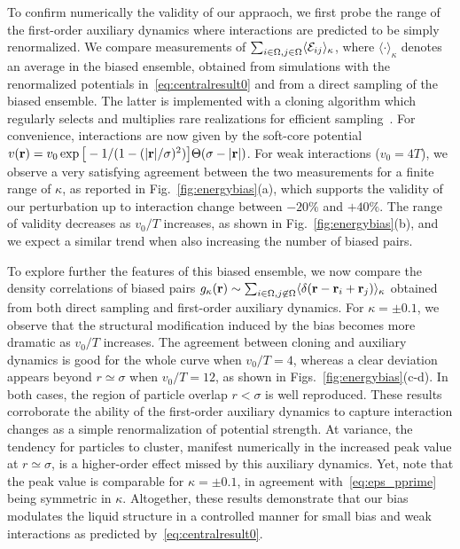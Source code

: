 \documentclass[superscriptaddress, twocolumn, prx, longbibliography, nofootinbib]{revtex4-1}
\begin{document}
To confirm numerically the validity of our appraoch, we first probe the range of the first-order auxiliary dynamics where interactions {are predicted to be} simply renormalized. We compare measurements of $\sum_{i\in\Omega, j\in\Omega}\langle{\cal E}_{ij}\rangle_\kappa$, where $\langle\cdot\rangle_\kappa$ denotes an average in the biased ensemble, obtained from simulations {with} {the renormalized potentials in}~\eqref{eq:centralresult0} and from a direct sampling of the biased ensemble. The latter is implemented with a cloning algorithm which regularly selects and multiplies rare realizations for efficient sampling~\cite{Giadina2006, tailleur2007probing, Hurtado2009, Nemoto2016, Ray2018, Klymko2018, Brewer2018}. For convenience, interactions are now given by the soft-core potential $v({\bf r}) = v_0\exp\big[-1 / (1 - (|{\bf r}|/\sigma)^2)\big]\Theta(\sigma-|{\bf r}|)$. For weak interactions ($v_0=4T$), we observe a very satisfying agreement between the two measurements for a finite range of $\kappa$, as reported in Fig.~\ref{fig:energybias}(a), which supports the validity of our perturbation up to interaction change between $-20\%$ and $+40\%$. The range of validity decreases as $v_0/T$ increases, as shown in Fig.~\ref{fig:energybias}(b), and we expect a similar trend when also increasing the number of biased pairs.


To explore further the features of this biased ensemble, we now compare the density correlations of biased pairs $g_\kappa({\bf r})\sim \sum_{i\in\Omega,j\not\in\Omega}\langle \delta({\bf r}-{\bf r}_i+{\bf r}_j)\rangle_\kappa$ obtained from both direct sampling and first-order auxiliary dynamics. For $\kappa=\pm0.1$, we observe that the structural modification induced by the bias becomes more dramatic as $v_0/T$ increases. The agreement between cloning and auxiliary dynamics is good for the whole curve when $v_0/T=4$, whereas a clear deviation appears beyond $r\simeq\sigma$ when $v_0/T=12$, as shown in Figs.~\ref{fig:energybias}(c-d). In both cases, the region of particle overlap $r<\sigma$ is well reproduced. {These results corroborate the ability of the first-order auxiliary dynamics to capture interaction changes as a simple renormalization of potential strength. At variance, the tendency for particles to cluster, manifest numerically in the increased peak value at $r\simeq\sigma$, is a higher-order effect missed by this auxiliary dynamics. Yet, note that the peak value is comparable for $\kappa=\pm0.1$, in agreement with~\eqref{eq:eps_pprime} being symmetric in $\kappa$.} Altogether, these results demonstrate that our bias modulates the liquid structure in a controlled manner for small bias and weak interactions as predicted by~\eqref{eq:centralresult0}.
\end{document}
